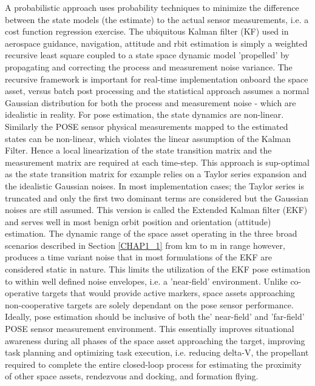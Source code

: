 A probabilistic approach uses probability techniques to minimize the difference between the state models (the estimate) to the actual sensor measurements, i.e. a cost function regression exercise. The ubiquitous Kalman filter (KF) used in  aerospace guidance, navigation, attitude and rbit estimation is simply a weighted recursive least square coupled to a state space dynamic model 'propelled' by propagating and correcting the process and measurement noise variance. The recursive framework is important for real-time implementation onboard the space asset, versus batch post processing and the statistical approach assumes a normal Gaussian distribution for both the process and measurement noise - which are idealistic in reality. For pose estimation, the state dynamics are non-linear. Similarly the POSE sensor physical measurements mapped to the estimated states can be non-linear, which violates the linear assumption of the Kalman Filter. Hence a local linearization of the state transition matrix and the measurement matrix are required at each time-step. This approach is sup-optimal as the state transition matrix for example relies on a Taylor series expansion and the idealistic Gaussian noises. In most implementation cases; the Taylor series is truncated and only the first two dominant terms are considered but the Gaussian noises are still assumed. This version is called the Extended Kalman filter (EKF) and serves well in most benign orbit position and orientation (attitude) estimation. The dynamic range of the space asset operating in the three broad scenarios described in Section \ref{CHAP1_1} from km to m in range however, produces a time variant noise that in most formulations of the EKF are considered static in nature. This limits the utilization of the EKF pose estimation to within well defined noise envelopes, i.e. a 'near-field' environment. Unlike co-operative targets that would provide active markers, space assets approaching non-cooperative targets are solely dependant on the pose sensor performance. Ideally, pose estimation should be inclusive of both the' near-field' and 'far-field' POSE sensor measurement environment. This essentially improves situational awareness during all phases of the space asset approaching the target, improving task planning and optimizing task execution, i.e. reducing delta-V, the propellant required to complete the entire closed-loop process for estimating the proximity of other space assets, rendezvous and docking, and formation flying.
	
